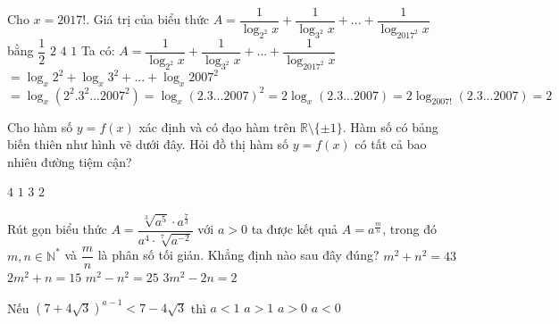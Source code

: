 \begin{ex}%
Cho $x=2017!$. Giá trị của biểu thức $A=\dfrac{1}{{{\log }_{{{2}^2}}}x}+\dfrac{1}{{{\log }_{{{3}^2}}}x}+...+\dfrac{1}{{{\log }_{{{2017}^2}}}x}$ bằng
\choice
{$\dfrac{1}{2}$}
{\True $2$}
{$4$}
{$1$}
\loigiai
{Ta có: $A=\dfrac{1}{{{\log }_{{{2}^2}}}x}+\dfrac{1}{{{\log }_{{{3}^2}}}x}+...+\dfrac{1}{{{\log }_{{{2017}^2}}}x}$
	$={{\log }_{x}}{{2}^2}+{{\log }_{x}}{{3}^2}+...+{{\log }_{x}}{{2007}^2}$
	$={{\log }_{x}}({{2}^2}{{.3}^2}{{...2007}^2} )={{\log }_{x}}{{(2.3...2007 )}^2}=2{{\log }_{x}}(2.3...2007 )=2{{\log }_{2007!}}(2.3...2007 )=2$}
\end{ex}
\begin{ex}%
Cho hàm số $y=f(x)$ xác định và có đạo hàm trên $\mathbb{R}\setminus \{\pm 1\}.$ Hàm số có bảng biến thiên như hình vẽ dưới đây. Hỏi đồ thị hàm số $y=f(x)$ có tất cả bao nhiêu đường tiệm cận?
\begin{center}
\end{center}
\choice
{$4$}
{$1$}
{\True $3$}
{$2$}
\end{ex}
\begin{ex}%
Rút gọn biểu thức $A=\dfrac{\sqrt[3]{a^5}\cdot a^{\frac{7}{3}}}{a^4\cdot \sqrt[7]{a^{-2}}}$  với $a>0$  ta được kết quả $A=a^{\frac{m}{n}}$, trong đó $m,n\in\mathbb{N^*}$  và $\dfrac{m}{n}$  là phân số tối giản. Khẳng định nào sau đây đúng?
\choice
{$m^2+n^2=43$}
{\True $2m^2+n=15$}
{$m^2-n^2=25$}
{$3m^2-2n=2$}
\end{ex}
\begin{ex}%
	Nếu ${(7+4\sqrt 3 )^{a-1}}<7-4\sqrt 3$ thì
	\choice
	{$a<1$}
	{$a>1$}
	{$a>0$}
	{\True $a<0$}
\end{ex}


